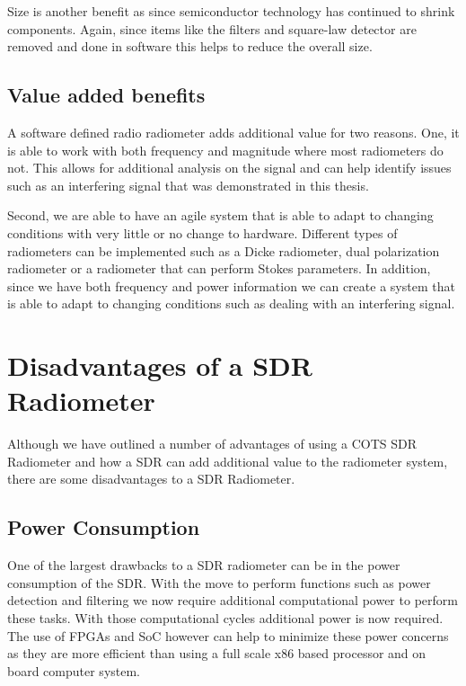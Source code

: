 {\begin{table}[h!tb]
\begin{tabular}{lc}
\end{tabular}
\end{table}

Size is another benefit as since semiconductor technology has continued to shrink components.  Again, since items like the filters and square-law detector are removed and done in software this helps to reduce the overall size.  

\subsection{Value added benefits}

A software defined radio radiometer adds additional value for two reasons.  One, it is able to work with both frequency and magnitude where most radiometers do not.  This allows for additional analysis on the signal and can help identify issues such as an interfering signal that was demonstrated in this thesis.  

Second, we are able to have an agile system that is able to adapt to changing conditions with very little or no change to hardware.  Different types of radiometers can be implemented such as a Dicke radiometer, dual polarization radiometer or a radiometer that can perform Stokes parameters.  In addition, since we have both frequency and power information we can create a system that is able to adapt to changing conditions such as dealing with an interfering signal.  

\section{Disadvantages of a SDR Radiometer}
Although we have outlined a number of advantages of using a COTS SDR Radiometer and how a SDR can add additional value to the radiometer system, there are some disadvantages to a SDR Radiometer.

\subsection{Power Consumption}
One of the largest drawbacks to a SDR radiometer can be in the power consumption of the SDR.  With the move to perform functions such as power detection and filtering we now require additional computational power to perform these tasks.  With those computational cycles additional power is now required.  The use of FPGAs and SoC however can help to minimize these power concerns as they are more efficient than using a full scale x86 based processor and on board computer system.  

}
